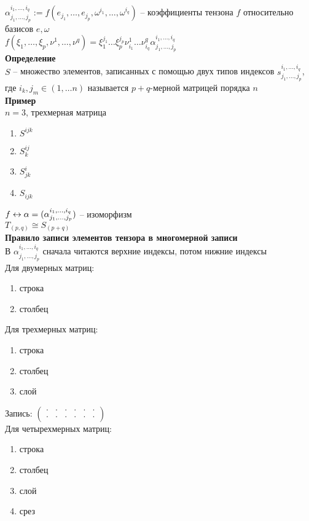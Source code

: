 \documentclass[12pt]{article}
\begin{document}
$\alpha_{j_1, \ldots, j_p}^{i_1, \ldots, i_q} := f(e_{j_1}, \ldots, e_{j_p},\omega^{i_1}, \ldots, \omega^{i_q})$ -- коэффициенты тензона $f$ относительно базисов $e, \omega$\\
$f(\xi_1, \ldots, \xi_p, \nu^1, \ldots, \nu^q)=\xi_1^{j_1}\ldots\xi_p^{j_p}\nu^1_{i_1}\ldots\nu^q_{i_q}\alpha_{j_1, \ldots, j_p}^{i_1, \ldots, i_q}$\\
\textbf{Определение}\\
$S$ -- множество элементов, записанных с помощью двух типов индексов $s_{j_1, \ldots, j_p}^{i_1, \ldots, i_q}$, где $i_k, j_m \in (1,\ldots n)$ называется $p+q$-мерной матрицей порядка $n$\\
\textbf{Пример}\\
$n = 3$, трехмерная матрица
\begin{enumerate}
    \item $S^{ijk}$
    \item $S^{ij}_k$
    \item $S^i_{jk}$
    \item $S_{ijk}$
\end{enumerate}
$f \leftrightarrow \alpha = (\alpha_{j_1, \ldots, j_p}^{i_1, \ldots, i_q})$ -- изоморфизм\\
$T_{(p,q)} \cong S_(p+q)$\\
\textbf{Правило записи элементов тензора в многомерной записи}\\
В $\alpha_{j_1, \ldots, j_p}^{i_1, \ldots, i_q}$ сначала читаются верхние индексы, потом нижние индексы\\
Для двумерных матриц:
\begin{enumerate}
    \item строка
    \item столбец
\end{enumerate}
Для трехмерных матриц:
\begin{enumerate}
    \item строка
    \item столбец
    \item слой
\end{enumerate}
Запись: $\left(\begin{array}{cc|cc|cc}
    \cdot & \cdot & \cdot & \cdot & \cdot & \cdot\\
    \cdot & \cdot & \cdot & \cdot & \cdot & \cdot
\end{array}\right)$\\
Для четырехмерных матриц:
\begin{enumerate}
    \item строка
    \item столбец
    \item слой
    \item срез
\end{enumerate}
\end{document}
